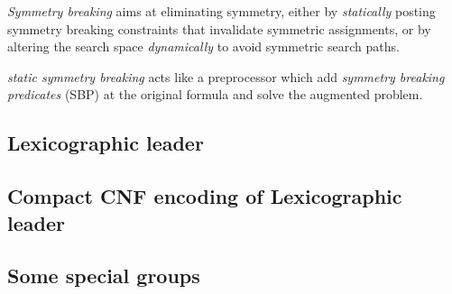 \emph{Symmetry breaking} aims at eliminating symmetry, either
by \emph{statically} posting symmetry breaking constraints that invalidate symmetric
assignments, or by altering the search space \emph{dynamically} to avoid symmetric search paths.

\emph{static symmetry breaking} acts like a preprocessor which add \emph{symmetry breaking predicates} (SBP)
at the original formula and solve the augmented problem.


\subsection{Lexicographic leader}
\subsection{Compact CNF encoding of Lexicographic leader}

\subsection{Some special groups}




